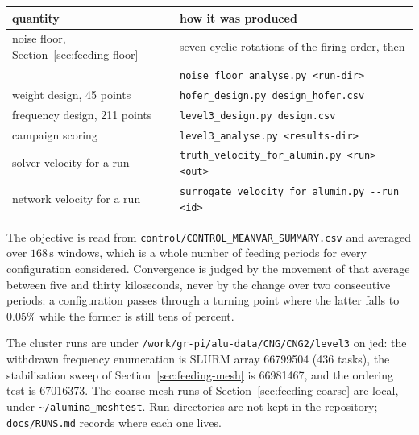 \documentclass[11pt,a4paper]{article}
\theoremstyle{plain}
\theoremstyle{definition}
\theoremstyle{remark}
\begin{document}
\begin{center}
\small
\begin{tabular}{@{}ll@{}}
\toprule
quantity & how it was produced \\
\midrule
noise floor, Section~\ref{sec:feeding-floor}
  & seven cyclic rotations of the firing order, then \\
  & \verb|noise_floor_analyse.py <run-dir>| \\
weight design, 45 points
  & \verb|hofer_design.py design_hofer.csv| \\
frequency design, 211 points
  & \verb|level3_design.py design.csv| \\
campaign scoring
  & \verb|level3_analyse.py <results-dir>| \\
solver velocity for a run
  & \verb|truth_velocity_for_alumin.py <run> <out>| \\
network velocity for a run
  & \verb|surrogate_velocity_for_alumin.py --run <id>| \\
\bottomrule
\end{tabular}
\end{center}

The objective is read from \verb|control/CONTROL_MEANVAR_SUMMARY.csv| and
averaged over $168\,\mathrm{s}$ windows, which is a whole number of feeding
periods for every configuration considered. Convergence is judged by the movement
of that average between five and thirty kiloseconds, never by the change over two
consecutive periods: a configuration passes through a turning point where the
latter falls to $0.05\%$ while the former is still tens of percent.

The cluster runs are under \verb|/work/gr-pi/alu-data/CNG/CNG2/level3| on jed:
the withdrawn frequency enumeration is SLURM array 66799504 (436 tasks), the
stabilisation sweep of Section~\ref{sec:feeding-mesh} is 66981467, and the
ordering test is 67016373. The coarse-mesh runs of
Section~\ref{sec:feeding-coarse} are local, under \verb|~/alumina_meshtest|.
Run directories are not kept in the repository; \verb|docs/RUNS.md| records where
each one lives.
\end{document}
